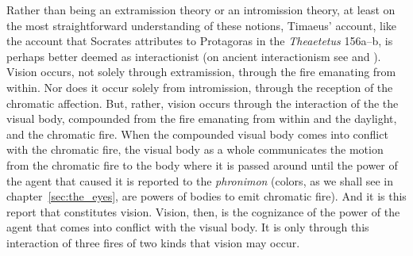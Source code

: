 Rather than being an extramission theory or an intromission theory, at least on the most straightforward understanding of these notions, Timaeus' account, like the account that Socrates attributes to Protagoras in the \emph{Theaetetus} 156a--b, is perhaps better deemed as interactionist (on ancient interactionism see  \citealt{Remes:2014en} and \citealt{Squire:2016aa}). Vision occurs, not solely through extramission, through the fire emanating from within. Nor does it occur solely from intromission, through the reception of the chromatic affection. But, rather, vision occurs through the interaction of the the visual body, compounded from the fire emanating from within and the daylight, and the chromatic fire. When the compounded visual body comes into conflict with the chromatic fire, the visual body as a whole communicates the motion from the chromatic fire to the body where it is passed around until the power of the agent that caused it is reported to the \emph{phronimon} (colors, as we shall see in chapter~\ref{sec:the_eyes}, are powers of bodies to emit chromatic fire). And it is this report that constitutes vision. Vision, then, is the cognizance of the power of the agent that comes into conflict with the visual body. It is only through this interaction of three fires of two kinds that vision may occur.






